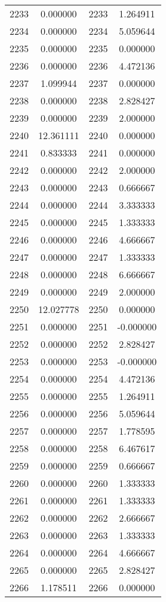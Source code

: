 \documentclass[12pt]{article}
\begin{document}
\begin{longtable}{@{}cccc@{}}
2233 & 0.000000 & 2233 & 1.264911 \\
2234 & 0.000000 & 2234 & 5.059644 \\
2235 & 0.000000 & 2235 & 0.000000 \\
2236 & 0.000000 & 2236 & 4.472136 \\
2237 & 1.099944 & 2237 & 0.000000 \\
2238 & 0.000000 & 2238 & 2.828427 \\
2239 & 0.000000 & 2239 & 2.000000 \\
2240 & 12.361111 & 2240 & 0.000000 \\
2241 & 0.833333 & 2241 & 0.000000 \\
2242 & 0.000000 & 2242 & 2.000000 \\
2243 & 0.000000 & 2243 & 0.666667 \\
2244 & 0.000000 & 2244 & 3.333333 \\
2245 & 0.000000 & 2245 & 1.333333 \\
2246 & 0.000000 & 2246 & 4.666667 \\
2247 & 0.000000 & 2247 & 1.333333 \\
2248 & 0.000000 & 2248 & 6.666667 \\
2249 & 0.000000 & 2249 & 2.000000 \\
2250 & 12.027778 & 2250 & 0.000000 \\
2251 & 0.000000 & 2251 & -0.000000 \\
2252 & 0.000000 & 2252 & 2.828427 \\
2253 & 0.000000 & 2253 & -0.000000 \\
2254 & 0.000000 & 2254 & 4.472136 \\
2255 & 0.000000 & 2255 & 1.264911 \\
2256 & 0.000000 & 2256 & 5.059644 \\
2257 & 0.000000 & 2257 & 1.778595 \\
2258 & 0.000000 & 2258 & 6.467617 \\
2259 & 0.000000 & 2259 & 0.666667 \\
2260 & 0.000000 & 2260 & 1.333333 \\
2261 & 0.000000 & 2261 & 1.333333 \\
2262 & 0.000000 & 2262 & 2.666667 \\
2263 & 0.000000 & 2263 & 1.333333 \\
2264 & 0.000000 & 2264 & 4.666667 \\
2265 & 0.000000 & 2265 & 2.828427 \\
2266 & 1.178511 & 2266 & 0.000000 \\

\end{longtable}
\end{document}
